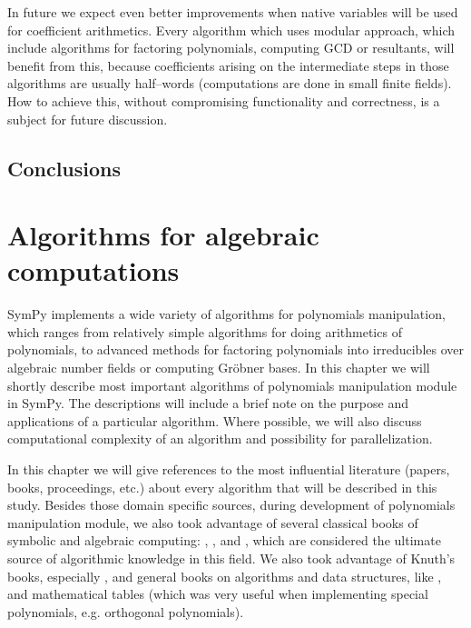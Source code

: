 In future we expect even better improvements when native variables will be used for coefficient
arithmetics. Every algorithm which uses modular approach, which include algorithms for factoring
polynomials, computing GCD or resultants, will benefit from this, because coefficients arising
on the intermediate steps in those algorithms are usually half--words (computations are done in
small finite fields). How to achieve this, without compromising functionality and correctness,
is a subject for future discussion.


\subsection{Conclusions}

\hypertarget{--doc-src/algorithms}{}

\section{Algorithms for algebraic computations}\label{thesis-algorithms}

SymPy implements a wide variety of algorithms for polynomials manipulation, which ranges from
relatively simple algorithms for doing arithmetics of polynomials, to advanced methods for
factoring polynomials into irreducibles over algebraic number fields or computing Gröbner
bases. In this chapter we will shortly describe most important algorithms of polynomials
manipulation module in SymPy. The descriptions will include a brief note on the purpose and
applications of a particular algorithm. Where possible, we will also discuss computational
complexity of an algorithm and possibility for parallelization.

In this chapter we will give references to the most influential literature (papers, books,
proceedings, etc.) about every algorithm that will be described in this study. Besides those
domain specific sources, during development of polynomials manipulation module, we also took
advantage of several classical books of symbolic and algebraic computing: \cite{Davenport1988systems},
\cite{Geddes1992algorithms}, \cite{Gathen1999modern} and \cite{Grabmeier2003algebra}, which are considered the
ultimate source of algorithmic knowledge in this field. We also took advantage of Knuth's books,
especially \cite{Knuth1985seminumerical}, and general books on algorithms and data structures, like
\cite{Cormen2001algorithms}, and mathematical tables \cite{Abramowitz1964handbook} (which was very useful
when implementing special polynomials, e.g. orthogonal polynomials).



